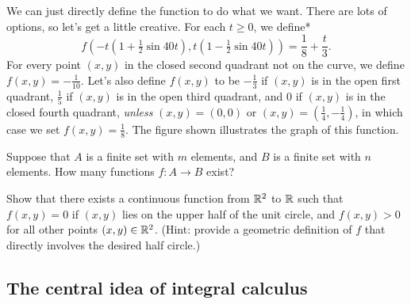 \documentclass{watsonbook}
\begin{document}
\begin{solution}
  \begin{minipage}[t]{0.65\textwidth}
    We can just directly define the function to do what we want. There
    are lots of options, so let's get a little creative. For each
    $t \geq 0$, we define* 
    \[
      f\left(-t\left(1+\tfrac{1}{2}\sin
          40t\right),t\left(1-\tfrac{1}{2}\sin 40t\right)\right) =
      \frac{1}{8} + \frac{t}{3}. 
    \]
    For every point $(x,y)$ in the closed second quadrant not on the
    curve, we define $f(x,y) = -\tfrac{1}{10}$. Let's also define
    $f(x,y)$ to be $-\tfrac{1}{3}$ if $(x,y)$ is in the open first
    quadrant, $\tfrac{1}{5}$ if $(x,y)$ is in the open third quadrant,
    and 0 if $(x,y)$ is in the closed fourth quadrant, \textit{unless}
    $(x,y) = (0,0)$ or
    $(x,y) = \left(\tfrac{1}{4}, -\tfrac{1}{4}\right)$, in which case
    we set $f(x,y) = \frac{1}{8}$. The figure shown illustrates the
    graph of this function.
  \end{minipage} \hfill
  \begin{minipage}[t]{0.34\textwidth}
    \centering 
    \raisebox{\dimexpr -\height + 1.5 ex \relax}{
      \usebox{\asybox}}
  \end{minipage}
\end{solution}

\begin{exercise}{}{}
  Suppose that $A$ is a finite set with $m$ elements, and $B$ is a
  finite set with $n$ elements. How many functions $f:A \to B$ exist?
\end{exercise}

\begin{exercise}{}{}
  Show that there exists a continuous function from $\mathbb{R}^2$ to $\mathbb{R}$
  such that $f(x,y) = 0$ if $(x,y)$ lies on the upper half of the unit
  circle, and $f(x,y) > 0$ for all other points $(x,y) \in
  \mathbb{R}^2$. (Hint: provide a geometric definition of $f$ that directly
  involves the desired half circle.)
\end{exercise}

\newpage 

\subsection{The central idea of integral calculus} \label{sec:centralidea}
\end{document}

